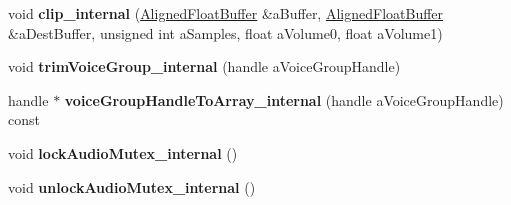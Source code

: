 \begin{DoxyCompactItemize}
void {\bfseries clip\+\_\+internal} (\mbox{\hyperlink{class_so_loud_1_1_aligned_float_buffer}{Aligned\+Float\+Buffer}} \&a\+Buffer, \mbox{\hyperlink{class_so_loud_1_1_aligned_float_buffer}{Aligned\+Float\+Buffer}} \&a\+Dest\+Buffer, unsigned int a\+Samples, float a\+Volume0, float a\+Volume1)
\item 
\mbox{\label{class_so_loud_1_1_soloud_a4bae2b6e943c368c85c7142a12ec6953}} 
void {\bfseries trim\+Voice\+Group\+\_\+internal} (handle a\+Voice\+Group\+Handle)
\item 
\mbox{\label{class_so_loud_1_1_soloud_a8b3c576cee49d758d0e1280093c834ac}} 
handle $\ast$ {\bfseries voice\+Group\+Handle\+To\+Array\+\_\+internal} (handle a\+Voice\+Group\+Handle) const
\item 
\mbox{\label{class_so_loud_1_1_soloud_a5bc0cacc1ba46b380848f3f11df83039}} 
void {\bfseries lock\+Audio\+Mutex\+\_\+internal} ()
\item 
\mbox{\label{class_so_loud_1_1_soloud_a8c3590472cff6b597a47ccd0a5265b7c}} 
void {\bfseries unlock\+Audio\+Mutex\+\_\+internal} ()
\end{DoxyCompactItemize}
